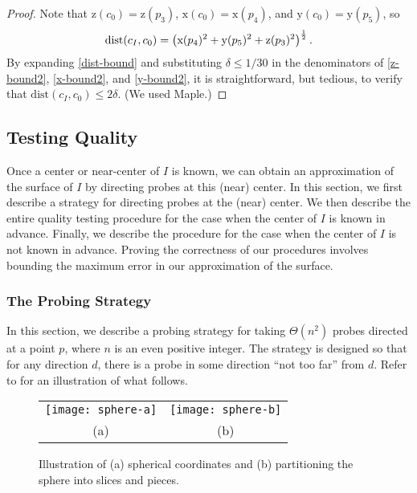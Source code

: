\documentclass[11pt]{article}
\newcommand{\mysqrt}[1]{\left({#1}\right)^\frac{1}{2}}
\newcommand{\dist}{\mathrm{dist}}
\newcommand{\x}{\mathrm{x}}
\newcommand{\y}{\mathrm{y}}
\newcommand{\z}{\mathrm{z}}
\begin{document}
\begin{proof}
Note that $\z(c_0)=\z(p_3)$, $\x(c_0)=\x(p_4)$, and $\y(c_0)=\y(p_5)$, so
\begin{equation}
\dist(c_I,c_0) = \mysqrt{\x(p_4)^2+\y(p_5)^2+\z(p_3)^2}. \eqlabel{dist-bound}
\end{equation}
By expanding \eqref{dist-bound} and substituting $\delta\le 1/30$ in the
denominators of \eqref{z-bound2}, \eqref{x-bound2}, and
\eqref{y-bound2}, it is straightforward, but tedious, to verify that
$\dist(c_I,c_0)\le2\delta$. (We used Maple.)
\end{proof}

\subsection{Testing Quality}

Once a center or near-center of $I$ is known, we can obtain an
approximation of the surface of $I$ by directing probes at this (near)
center.  In this section, we first describe a strategy for directing
probes at the (near) center.  We then describe the entire quality
testing procedure for the case when the center of $I$ is known in
advance.  Finally, we describe the procedure for the case when the
center of $I$ is not known in advance.  Proving the correctness of our
procedures involves bounding the maximum error in our approximation of
the surface.

\subsubsection{The Probing Strategy}

In this section, we describe a probing strategy for taking
$\Theta(n^2)$ probes directed at a point $p$, where $n$ is an even
positive integer.  The strategy is designed so that for any direction
$d$, there is a probe in some direction ``not too far'' from $d$.
Refer to  for an illustration of what follows.

\begin{figure}
\begin{center}\begin{tabular}{cc}
\texttt{[image: sphere-a]} & \texttt{[image: sphere-b]} \\
(a) & (b) 
\end{tabular}\end{center}
\caption{Illustration of (a) spherical coordinates and (b) partitioning
         the sphere into slices and pieces.}
\end{figure}
\end{document}
